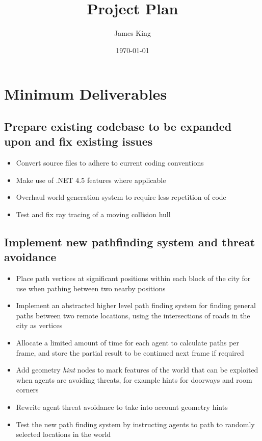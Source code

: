 \documentclass[a4paper,11pt]{article}
\title{\centering Project Plan}
\date{\today}
\author{James King}
\begin{document}
\section{Minimum Deliverables}
\subsection{Prepare existing codebase to be expanded upon and fix existing issues}
    \begin{itemize}
    \item Convert source files to adhere to current coding conventions
    \item Make use of .NET 4.5 features where applicable
    \item Overhaul world generation system to require less repetition of code
    \item Test and fix ray tracing of a moving collision hull
    \end{itemize}
\subsection{Implement new pathfinding system and threat avoidance}
    \begin{itemize}
    \item Place path vertices at significant positions within each block of
        the city for use when pathing between two nearby positions
    \item Implement an abstracted higher level path finding system for finding
        general paths between two remote locations, using the intersections of
        roads in the city as vertices
    \item Allocate a limited amount of time for each agent to calculate paths
        per frame, and store the partial result to be continued next frame if
        required
    \item Add geometry \emph{hint} nodes to mark features of the world that can
        be exploited when agents are avoiding threats, for example hints for
        doorways and room corners
    \item Rewrite agent threat avoidance to take into account geometry hints
    \item Test the new path finding system by instructing agents to path to
        randomly selected locations in the world
    \end{itemize}
\end{document}
